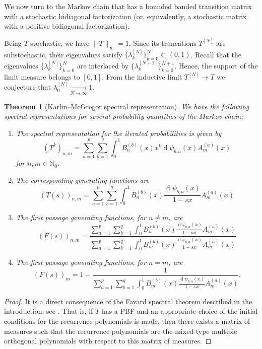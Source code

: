\documentclass[11pt]{amsart}
\theoremstyle{plain}
\newtheorem{teo}{Theorem}[section]
\renewcommand{\d}{\operatorname{d}}
\newcommand{\N}{\mathbb{N}}
\newcommand{\1}{\text{\fontseries{bx}\selectfont \textup 1}}
\begin{document}
We now turn to the Markov chain that has a bounded banded transition matrix with a stochastic bidiagonal factorization (or, equivalently, a stochastic matrix with a positive bidiagonal factorization).

Being $T$ stochastic, we have $\|T\|_\infty =1$. Since its truncations $T^{[N]}$ are substochastic, their eigenvalues satisfy $\{\lambda_k^{[N]}\}_{k=0}^N\subset (0,1)$. Recall that the eigenvalues $\{\lambda_k^{[N]}\}_{k=0}^N$ are interlaced by $\{\lambda_k^{[N+1]}\}_{k=0}^{N+1}$. Hence, the support of the limit measure belongs to $[0,1]$.
From the inductive limit $T^{[N]}\to T$ we conjecture that $\lambda_0^{[N]}\xrightarrow[N\to\infty]{}1$.

\begin{teo}[Karlin--McGregor spectral representation]
	We have the following spectral representations for several probability quantities of the Markov chain:
	\begin{enumerate}
		\item 	The spectral representation for the iterated probabilities is given by
		\[
		(T^k)_{n,m}=
		\sum_{a=1}^p\sum_{b=1}^{q}	\int_0^1B^{(b)}_n(x)x^k\d\psi_{b,a}(x)A^{(a)}_{m}(x)
		\]
		for $n,m\in\N_0$.
		\item The corresponding generating functions are
		\[
		(T(s))_{n,m}=
		\sum_{a=1}^p\sum_{b=1}^{q}	\int_0^1B^{(b)}_n(x)\frac{\d\psi_{b,a}(x)}{1-sx}A^{(a)}_{m}(x)
		\]
		\item The first passage generating functions, for $n\neq m$, are
		\[
		(F(s))_{n,m}=
		\frac{	\sum_{a=1}^p\sum_{b=1}^{q}	\int_0^1B^{(b)}_n(x)\frac{\d\psi_{b,a}(x)}{1-sx}A^{(a)}_{m}(x)}{
			\sum_{a=1}^p\sum_{b=1}^{q}	\int_0^1B^{(b)}_m(x)\frac{\d\psi_{b,a}(x)}{1-sx}A^{(a)}_{m}(x)}
		\]
		\item The first passage generating functions, for $n= m$, are
		\[
		(F(s))_{m}=1-\frac{1}{\sum_{a=1}^p\sum_{b=1}^{q}	\int_0^1B^{(b)}_m(x)\frac{\d\psi_{b,a}(x)}{1-sx}A^{(a)}_{m}(x)}.
		\]
	\end{enumerate}
\end{teo}
\begin{proof}
	It is a direct consequence of the Favard spectral theorem described in the introduction, see \cite{BFM1}. That is, if $T$ has a PBF and an appropriate choice of the initial conditions for the recurrence polynomials is made, then there exists a matrix of measures such that the recurrence polynomials are the mixed-type multiple orthogonal polynomials with respect to this matrix of measures.
\end{proof}
\end{document}
